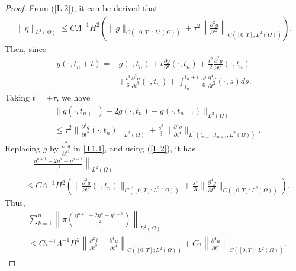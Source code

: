 \documentclass[preprint,12pt]{elsarticle}
\begin{document}
\begin{proof}
From (\ref{L.2}), it can be derived that
\begin{equation}\label{T1.2}
\begin{aligned}
     \|\eta\|_{L^2(\Omega)}\leq C\Lambda^{-1}H^2\left(\|g\|_{C([0,T];L^2(\Omega))}+\tau^2\left\|\frac{\partial^2g}{\partial t^2}\right\|_{C([0,T];L^2(\Omega))}\right).
\end{aligned}
\end{equation}
Then, since
\begin{equation}\label{T2}
\begin{aligned}
     g(\cdot,t_n+t)=&g(\cdot,t_n)+t\frac{\partial g}{\partial t}(\cdot,t_n)+\frac{t^2}{2}\frac{\partial^2g}{\partial t^2}(\cdot,t_n)\\
     &+\frac{t^3}{6}\frac{\partial^3g}{\partial t^3}(\cdot,t_n)+\int_{t_n}^{t_n+t}\frac{s^3}{6}\frac{\partial^4g}{\partial t^4}(\cdot,s)ds.
\end{aligned}
\end{equation}
Taking $t=\pm\tau$, we have 
\begin{equation}\label{T2.1}
\begin{aligned}
     &\|g(\cdot,t_{n+1})-2g(\cdot,t_{n})+g(\cdot,t_{n-1})\|_{L^2(\Omega)}\\
     &\leq \tau^2\|\frac{\partial^2g}{\partial t^2}(\cdot,t_n)\|_{L^2(\Omega)}+\frac{s^3}{3}\|\frac{\partial^4g}{\partial t^4}\|_{L^1(t_{n-1},t_{n+1};L^2(\Omega))}.
\end{aligned}
\end{equation}
Replacing $g$ by $\frac{\partial^2g}{\partial t^2}$ in \ref{T1.1}, and using (\ref{L.2}), it has
\begin{equation}\label{T2.2}
\begin{aligned}
     &\left\|\frac{\eta^{n+1}-2\eta^n+\eta^{n-1}}{\tau^2}\right\|_{L^2(\Omega)}\\
     &\leq C\Lambda^{-1}H^2\left(\|\frac{\partial^2g}{\partial t^2}(\cdot,t_n)\|_{C([0,T];L^2(\Omega))}+\frac{s^3}{3}\|\frac{\partial^4g}{\partial t^4}\|_{C([0,T];L^2(\Omega))}\right).
\end{aligned}
\end{equation}
Thus, 
\begin{equation}\label{T2.3}
\begin{aligned}
     &\sum_{k=1}^n\left\|\pi\left(\frac{\eta^{n+1}-2\eta^n+\eta^{n-1}}{\tau^2}\right)\right\|_{L^2(\Omega)}\\
     &\leq C\tau^{-1}\Lambda^{-1}H^2\left\|\frac{\partial^2 f}{\partial t^2}-\frac{\partial^4 u}{\partial t^4}\right\|_{C([0,T];L^2(\Omega))}+C\tau\left\|\frac{\partial^4 u}{\partial t^4}\right\|_{C([0,T];L^2(\Omega))}.

\end{aligned}
\end{equation}
\end{proof}
\end{document}
